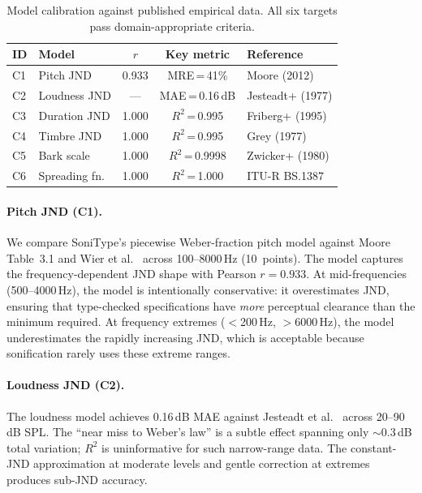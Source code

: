 \documentclass[sigchi, nonacm]{acmart}
\begin{document}
\begin{table}[t]
\centering
\caption{Model calibration against published empirical data. All six targets pass domain-appropriate criteria.}
\label{tab:calibration}
\small
\begin{tabular}{llccl}
\toprule
\textbf{ID} & \textbf{Model} & \textbf{$r$} & \textbf{Key metric} & \textbf{Reference} \\
\midrule
C1 & Pitch JND & 0.933 & MRE\,=\,41\% & Moore (2012) \\
C2 & Loudness JND & --- & MAE\,=\,0.16\,dB & Jesteadt+ (1977) \\
C3 & Duration JND & 1.000 & $R^2$\,=\,0.995 & Friberg+ (1995) \\
C4 & Timbre JND & 1.000 & $R^2$\,=\,0.995 & Grey (1977) \\
C5 & Bark scale & 1.000 & $R^2$\,=\,0.9998 & Zwicker+ (1980) \\
C6 & Spreading fn. & 1.000 & $R^2$\,=\,1.000 & ITU-R BS.1387 \\
\bottomrule
\end{tabular}
\end{table}

\paragraph{Pitch JND (C1).} We compare SoniType's piecewise Weber-fraction pitch model against Moore~\cite{moore2012introduction} Table~3.1 and Wier et al.~\cite{wier1977frequency} across 100--8000\,Hz (10~points). The model captures the frequency-dependent JND shape with Pearson $r = 0.933$. At mid-frequencies (500--4000\,Hz), the model is intentionally conservative: it overestimates JND, ensuring that type-checked specifications have \emph{more} perceptual clearance than the minimum required. At frequency extremes ($<$200\,Hz, $>$6000\,Hz), the model underestimates the rapidly increasing JND, which is acceptable because sonification rarely uses these extreme ranges.

\paragraph{Loudness JND (C2).} The loudness model achieves 0.16\,dB MAE against Jesteadt et al.~\cite{jesteadt1977intensity} across 20--90\,dB SPL. The ``near miss to Weber's law'' is a subtle effect spanning only $\sim$0.3\,dB total variation; $R^2$ is uninformative for such narrow-range data. The constant-JND approximation at moderate levels and gentle correction at extremes produces sub-JND accuracy.
\end{document}
